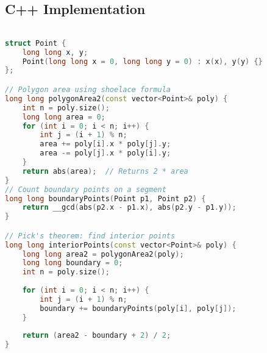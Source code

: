 
\subsection{C++ Implementation}

\begin{lstlisting}[language=C++, caption={C++ Implementation of Polygon Area Calculation}, label={lst:polygon_area_cpp}]

struct Point {
    long long x, y;
    Point(long long x = 0, long long y = 0) : x(x), y(y) {}
};

// Polygon area using shoelace formula
long long polygonArea2(const vector<Point>& poly) {
    int n = poly.size();
    long long area = 0;
    for (int i = 0; i < n; i++) {
        int j = (i + 1) % n;
        area += poly[i].x * poly[j].y;
        area -= poly[j].x * poly[i].y;
    }
    return abs(area);  // Returns 2 * area
}
// Count boundary points on a segment
long long boundaryPoints(Point p1, Point p2) {
    return __gcd(abs(p2.x - p1.x), abs(p2.y - p1.y));
}

// Pick's theorem: find interior points
long long interiorPoints(const vector<Point>& poly) {
    long long area2 = polygonArea2(poly);
    long long boundary = 0;
    int n = poly.size();
    
    for (int i = 0; i < n; i++) {
        int j = (i + 1) % n;
        boundary += boundaryPoints(poly[i], poly[j]);
    }
    
    return (area2 - boundary + 2) / 2;
}
\end{lstlisting}
